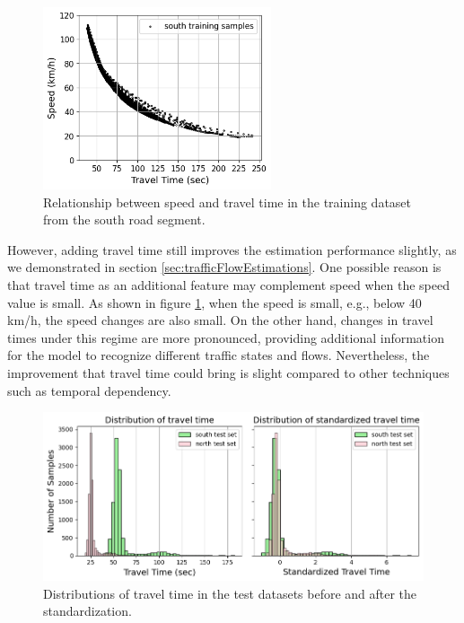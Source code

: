 \documentclass[english]{kththesis}
\begin{document}
\begin{figure}[!ht]
    \centering
    \includegraphics[width=0.6\textwidth]{speed_vs_travel_time.png}
    \caption{Relationship between speed and travel time in the training dataset from the south road segment.}
    \label{fig:speed_vs_travel_time}
\end{figure}

However, adding travel time still improves the estimation performance slightly, as we demonstrated in section \ref{sec:trafficFlowEstimations}. One possible reason is that travel time as an additional feature may complement speed when the speed value is small. As shown in figure \ref{fig:speed_vs_travel_time}, when the speed is small, e.g., below 40 km/h, the speed changes are also small. On the other hand, changes in travel times under this regime are more pronounced, providing additional information for the model to recognize different traffic states and flows. Nevertheless, the improvement that travel time could bring is slight compared to other techniques such as temporal dependency.

\begin{figure}[!ht]
    \centering
    \includegraphics[width=1.0\textwidth]{ttime_distribution_histogram.png}
    \caption{Distributions of travel time in the test datasets before and after the standardization.}
    \label{fig:travel_time_distribution_histogram}
\end{figure}
\end{document}
